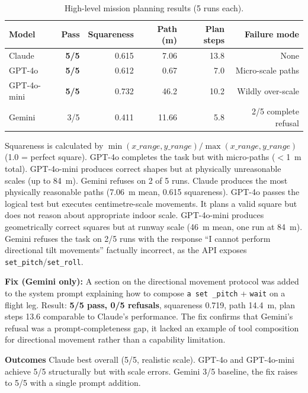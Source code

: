 \begin{table}[ht]
  \caption{High-level mission planning results (5 runs each).}
  \label{tab:ch3_c6}
  \centering
  \small
  \begin{tabular}{lrrrrr}
    \toprule
    Model & Pass & Squareness & Path (m) & Plan steps & Failure mode \\
    \midrule
    Claude      & \textbf{5/5} & 0.615 & 7.06  & 13.8 & None \\
    GPT-4o      & \textbf{5/5} & 0.612 & 0.67  & 7.0  & Micro-scale paths \\
    GPT-4o-mini & \textbf{5/5} & 0.732 & 46.2  & 10.2 & Wildly over-scale \\
    Gemini      & 3/5          & 0.411 & 11.66 & 5.8  & 2/5 complete refusal \\
    \bottomrule
  \end{tabular}
\end{table}
Squareness is calculated by $\min(x\_range, y\_range)/\max(x\_range, y\_range)$ (1.0 = perfect square). GPT-4o completes the task but with micro-paths ($<$1~m total).
GPT-4o-mini produces correct shapes but at physically unreasonable scales (up to 84~m). 
Gemini refuses on 2 of 5 runs.
Claude produces the most physically reasonable paths (7.06~m mean, 0.615 squareness). 
GPT-4o passes the logical test but executes centimetre-scale
movements.
It plans a valid square but does not reason about appropriate
indoor scale.
GPT-4o-mini produces geometrically correct squares but at
runway scale (46~m mean, one run at 84~m). 
Gemini refuses the task on 2/5 runs with the response ``I cannot perform directional tilt movements'' factually incorrect, as the API exposes \texttt{set\_pitch}/\texttt{set\_roll}.

\textbf{Fix (Gemini only):} A section on the directional movement protocol was added to the system prompt explaining how to compose \texttt{a set \_pitch} + \texttt{wait} on a flight leg.
Result: \textbf{5/5 pass, 0/5 refusals}, squareness 0.719, path 14.4~m, plan steps 13.6 comparable to Claude's performance.
The fix confirms that Gemini's refusal was a prompt-completeness gap, it lacked an example of tool composition for directional movement rather than a capability limitation.

\textbf{Outcomes} Claude best overall (5/5, realistic scale).
GPT-4o and GPT-4o-mini achieve 5/5 structurally but with scale errors. 
Gemini 3/5 baseline, the fix raises to 5/5 with a single prompt addition.


